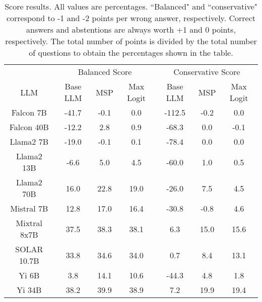 \begin{table*}
\centering
\begin{tabular}{c|c|c|c|c|c|c}
& \multicolumn{3}{c|}{Balanced Score} & \multicolumn{3}{c}{Conservative Score} \\ 
LLM & Base LLM & MSP & Max Logit & Base LLM & MSP & Max Logit\\ \hline
Falcon 7B & -41.7 & -0.1 & 0.0 & -112.5 & -0.2 & 0.0\\
Falcon 40B & -12.2 & 2.8 & 0.9 & -68.3 & 0.0 & -0.1\\
Llama2 7B & -19.0 & -0.1 & 0.1 & -78.4 & 0.0 & 0.0\\
Llama2 13B & -6.6 & 5.0 & 4.5 & -60.0 & 1.0 & 0.5\\
Llama2 70B & 16.0 & 22.8 & 19.0 & -26.0 & 7.5 & 4.5\\
Mistral 7B & 12.8 & 17.0 & 16.4 & -30.8 & -0.8 & 4.6\\
Mixtral 8x7B & 37.5 & 38.3 & 38.1 & 6.3 & 15.0 & 15.6\\
SOLAR 10.7B & 33.8 & 34.6 & 34.0 & 0.7 & 8.4 & 13.1\\
Yi 6B & 3.8 & 14.1 & 10.6 & -44.3 & 4.8 & 1.8\\
Yi 34B & 38.2 & 39.9 & 38.9 & 7.2 & 19.9 & 19.4\\
\hline
\end{tabular}
\caption{Score results. All values are percentages. ``Balanced" and ``conservative" correspond to -1 and -2 points per wrong answer, respectively. Correct answers and abstentions are always worth +1 and 0 points, respectively. The total number of points is divided by the total number of questions to obtain the percentages shown in the table.}
\label{tab:score}
\end{table*}
